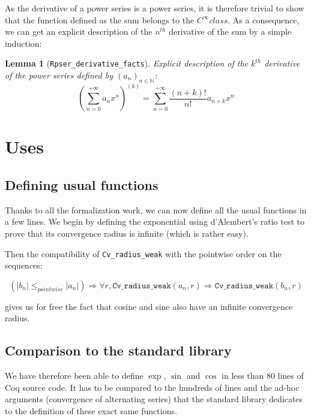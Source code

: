 \documentclass[submission,copyright]{eptcs}
\newcommand{\N}{\mathbb{N}}
\newcommand{\cvrw}{\texttt{Cv\_radius\_weak}}
\newtheorem{lemma}{Lemma}
\begin{document}

As the derivative of a power series is a power series, it is therefore trivial
to show that the function defined as the sum belongs to the $C^{\infty} class$.
As a consequence, we can get an explicit description of the $n^{th}$ derivative
of the sum by a simple induction:

\begin{lemma}[\texttt{Rpser\_derivative\_facts}] Explicit description of the
$k^{th}$ derivative of the power series defined by $(a_n)_{n\in \N}$:
$$(\sum_{n=0}^{+\infty} a_n x^n)^{(k)} = \sum_{n=0}^{+\infty}
\frac{(n + k)!}{n!} a_{n+k} x^n$$
\end{lemma}

\section{Uses}

\subsection{Defining usual functions}

Thanks to all the formalization work, we can now define all the usual
functions in a few lines. We begin by defining the exponential using
d'Alembert's ratio test to prove that its convergence radius is infinite
(which is rather easy).

Then the compatibility of \cvrw{} with the pointwise order on the
sequences:

$$\left(\left|b_n\right| \le_{pointwise} \left|a_n\right|\right)
  \Rightarrow \forall r, \cvrw{}(a_n,r) \Rightarrow \cvrw{}(b_n,r)$$

gives us for free the fact that cosine and sine also have an infinite
convergence radius.


\subsection{Comparison to the standard library}

We have therefore been able to define $\exp$, $\sin$ and $\cos$ in less
than 80 lines of Coq source code. It has to be compared to the hundreds
of lines and the ad-hoc arguments (convergence of alternating series)
that the standard library dedicates to the definition of these exact
same functions.
\end{document}
